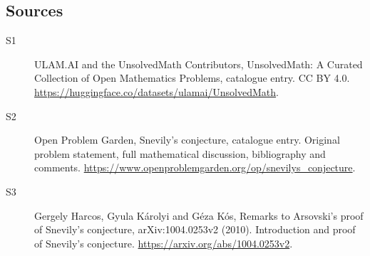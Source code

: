 \documentclass[11pt]{article}
\begin{document}
\subsection{Sources}
\begin{description}
\item[\hypertarget{source:statement:1}{S1}] ULAM.AI and the UnsolvedMath Contributors, UnsolvedMath: A Curated Collection of Open Mathematics Problems, catalogue entry. CC BY 4.0. \url{https://huggingface.co/datasets/ulamai/UnsolvedMath}.
\item[\hypertarget{source:statement:2}{S2}] Open Problem Garden, Snevily's conjecture, catalogue entry. Original problem statement, full mathematical discussion, bibliography and comments. \url{https://www.openproblemgarden.org/op/snevilys_conjecture}.
\item[\hypertarget{source:statement:3}{S3}] Gergely Harcos, Gyula Károlyi and Géza Kós, Remarks to Arsovski’s proof of Snevily’s conjecture, arXiv:1004.0253v2 (2010). Introduction and proof of Snevily’s conjecture. \url{https://arxiv.org/abs/1004.0253v2}.
\end{description}
\label{end:statement}
\end{document}
